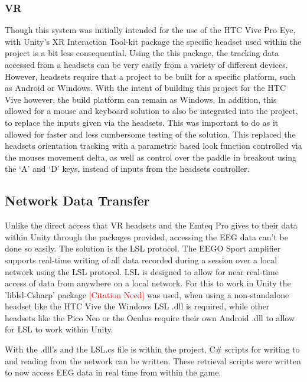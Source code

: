 \documentclass[11pt, a4paper]{article}
\newcommand{\addcitation}{\textcolor{red}{[Citation Need]}}
\begin{document}
\subsubsection{VR}	
Though this system was initially intended for the use of the HTC Vive Pro Eye, with Unity's XR Interaction Tool-kit package the specific headset used within the project is a bit less consequential. Using the this package, the tracking data accessed from a headsets can be very easily from a variety of different devices. However, headsets require that a project to be built for a specific platform, such as Android or Windows. With the intent of building this project for the HTC Vive however, the build platform can remain as Windows. In addition, this allowed for a mouse and keyboard solution to also be integrated into the project, to replace the inputs given via the headsets. This was important to do as it allowed for faster and less cumbersome testing of the solution. This replaced the headsets orientation tracking with a parametric based look function controlled via the mouses movement delta, as well as control over the paddle in breakout using the `A' and `D' keys, instead of inputs from the headsets controller.





\subsection{Network Data Transfer}	
Unlike the direct access that VR headsets and the Emteq Pro gives to their data within Unity through the packages provided, accessing the EEG data can't be done so easily. The solution is the LSL protocol. 
The EEGO Sport amplifier supports real-time writing of all data recorded during a session over a local network using the LSL protocol. LSL is designed to allow for near real-time access of data from anywhere on a local network. For this to work in Unity the 'liblsl-Csharp' package \addcitation{} was used, when using a non-standalone headset like the HTC Vive the Windows LSL .dll is required, while other headsets like the Pico Neo or the Oculus require their own Android .dll to allow for LSL to work within Unity. 

With the .dll's and the LSL.cs file is within the project, C\# scripts for writing to and reading from the network can be written. These retrieval scripts were written to now access EEG data in real time from within the game.
\end{document}
